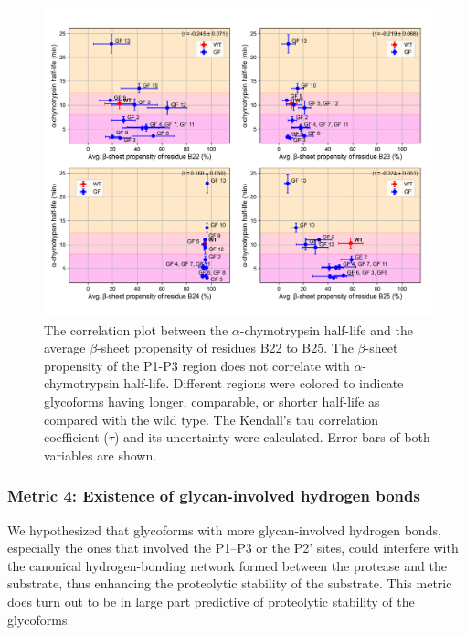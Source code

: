 \documentclass[sn-vancouver]{sn-jnl}
\begin{document}
\begin{figure}[H]
\centering
\includegraphics[width=\textwidth]{Figures/avg_beta_propensity_correlation.png}
\caption{The correlation plot between the $\alpha$-chymotrypsin half-life and the average $\beta$-sheet propensity of residues B22 to B25. The $\beta$-sheet propensity of the P1-P3 region does not correlate with $\alpha$-chymotrypsin half-life. Different regions were colored to indicate glycoforms having longer, comparable, or shorter half-life as compared with the wild type. The Kendall's tau correlation coefficient ($\tau$) and its uncertainty were calculated. Error bars of both variables are shown.}
\label{result_beta}
\end{figure}

\subsubsection*{Metric 4: Existence of glycan-involved hydrogen bonds}
We hypothesized that glycoforms with more glycan-involved hydrogen bonds, especially the ones that involved the P1--P3 or the P2' sites, could interfere with the canonical hydrogen-bonding network formed between the protease and the substrate, thus enhancing the proteolytic stability of the substrate. This metric does turn out to be in large part predictive of proteolytic stability of the glycoforms. 
\end{document}

